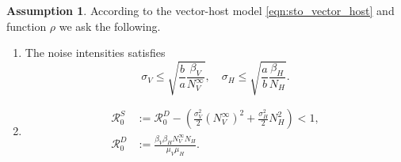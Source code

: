\documentclass{amsart}
\theoremstyle{plain}
\theoremstyle{definition}
\newtheorem{assumption}{Assumption}
\begin{document}
        \begin{assumption}\label{ass:extintion}
            According to the vector-host model \eqref{eqn:sto_vector_host} and 
            function
            $\rho$
            we ask the following.
            \begin{enumerate}[(E\textendash1)]
                \item \label{ass:noise_condition}
                    The noise intensities satisfies
                    $$
                        \sigma_V \leq 
                            \sqrt{
                                \frac{b}{a}
                                \frac{\beta_V}{N_V^{\infty}}
                                },
                         \quad
                        \sigma_H \leq
                            \sqrt{
                                \frac{a}{b}
                                \frac{\beta_H }{N_H
                            }}.
                    $$
                \item
                    \begin{equation*}
                        \begin{aligned}
                            \mathcal{R}_0 ^ S &:=
                                \mathcal{R}_0^D - 
                                \left( 
                                    \frac{\sigma_V ^ 2}{2} (N_V ^ {\infty}) ^ 2
                                    +
                                    \frac{\sigma_H ^ 2}{2} N_H ^ 2
                                \right)
                                <1,
                                \\
                            \mathcal{R}_0 ^ D &:=
                                    \frac{\beta_V \beta_H N_V ^ \infty 
                                    N_H}{\mu_V \mu_H} .
                        \end{aligned}
                    \end{equation*}
            \end{enumerate}
        \end{assumption}        
%
%
%
%
\end{document}
